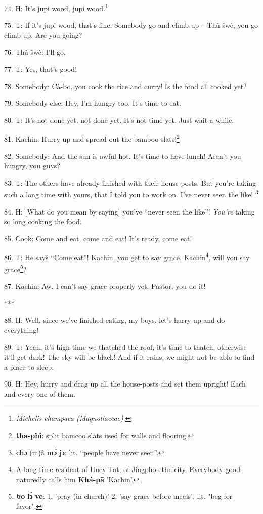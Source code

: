 74. H: It's jupi wood, jupi wood.\footnote{\textit{Michelis champaca (Magnoliaceae)}.}

75. T: If it's jupi wood, that's fine. Somebody go and climb up -- Thû-šwè,
you go climb up. Are you going?

76. Thû-šwè: I'll go.

77. T: Yes, that's good!

78. Somebody: Cà-bo, you cook the rice and curry! Is the food all cooked yet?

79. Somebody else: Hey, I'm hungry too. It's time to eat.

80. T: It's not done yet, not done yet. It's not time yet. Just wait a while.

81. Kachin: Hurry up and spread out the bamboo slats!\footnote{\textbf{tha-phî}: split bamcoo slats used for walls and flooring.}

82. Somebody: And the sun is awful hot. It's time to have lunch! Aren't you hungry,
you guys?

83. T: The others have already finished with their house-posts. But you're taking
such a long time with yours, that I told you to work on. I've never seen the like!
\footnote{\textbf{chɔ} (m)â \textbf{mɔ̀} \textbf{jɔ}: lit. ``people have never seen''.}

84. H: [What do you mean by saying] you've ``never seen the like''!
\textit{You're} taking so long cooking the food.

85. Cook: Come and eat, come and eat! It's ready, come eat!

86. T: He says ``Come eat''! Kachin, you get to say grace. Kachin\footnote{A long-time resident of Huey Tat, of Jingpho ethnicity. Everybody good-naturedly calls him \textbf{Khá-pā} 'Kachin'.}, will
you say grace\footnote{\textbf{bo} \textbf{lɔ̀} \textbf{ve}: 1. 'pray (in church)' 2. 'say grace before meals', lit. "beg for favor".}?

87. Kachin: Aw, I can't say grace properly yet. Pastor, you do it!

***

88. H: Well, since we've finished eating, my boys, let's hurry up and do everything!

89. T: Yeah, it's high time we thatched the roof, it's time to thatch, otherwise
it'll get dark! The sky will be black! And if it rains, we might not be able
to find a place to sleep.

90. H: Hey, hurry and drag up all the house-posts and set them upright! Each and
every one of them.


